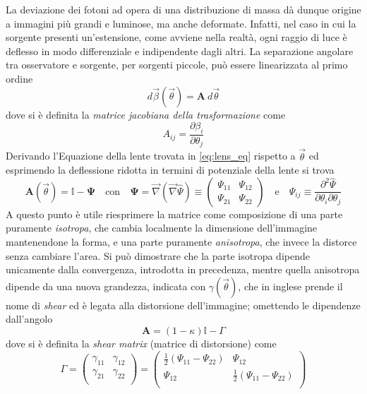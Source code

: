 La deviazione dei fotoni ad opera di una distribuzione di massa dà dunque origine a immagini più grandi e luminose, ma anche deformate. Infatti, nel caso in cui la sorgente presenti un'estensione, come avviene nella realtà, ogni raggio di luce è deflesso in modo differenziale e indipendente dagli altri. 
La separazione angolare tra osservatore e sorgente, per sorgenti piccole, può essere linearizzata al primo ordine
\begin{equation}
    d\vec\beta(\vec\theta)= \mathbf{A}\ d\vec\theta 
\end{equation}
dove si è definita la \emph{matrice jacobiana della trasformazione} come
\begin{equation}
   A_{ij}=\frac{\partial \beta_i}{\partial \theta_j}
   \label{eq:jacobian_matrix}
\end{equation}
Derivando l'Equazione della lente trovata in \ref{eq:lens_eq} rispetto a $\vec\theta$ ed esprimendo la deflessione ridotta in termini di potenziale della lente si trova 
\begin{equation}
    \mathbf{A}(\vec\theta)= \mathbb{I}- \mathbf{\Psi} \quad \text{con} \quad \mathbf{\Psi}=\vec\nabla(\vec\nabla\hat\Psi) \equiv \begin{pmatrix}
        \Psi_{11} & \Psi_{12}\\
        \Psi_{21} & \Psi_{22}
    \end{pmatrix}
    \quad \text{e} \quad \Psi_{ij}\equiv \frac{\partial^2\hat\Psi}{\partial \theta_i \partial \theta_j}
\end{equation}
A questo punto è utile riesprimere la matrice come composizione di una parte puramente \emph{isotropa}, che cambia localmente la dimensione dell'immagine mantenendone la forma, e una parte puramente \emph{anisotropa}, che invece la distorce senza cambiare l'area.
Si può dimostrare che la parte isotropa dipende unicamente dalla convergenza, introdotta in precedenza, mentre quella anisotropa dipende da una nuova grandezza, indicata con $\gamma(\vec\theta)$, che in inglese prende il nome di \emph{shear} ed è legata alla distorsione dell'immagine; omettendo le dipendenze dall'angolo
\begin{equation}
    \mathbf{A}=(1-\kappa)\mathbb{I}-\Gamma
\end{equation}
dove si è definita la \emph{shear matrix} (matrice di distorsione) come
\begin{equation}
    \Gamma= \begin{pmatrix}
        \gamma_{11} & \gamma_{12}\\
        \gamma_{21} & \gamma_{22}\\
    \end{pmatrix}=\begin{pmatrix}
        \frac{1}{2}(\Psi_{11}-\Psi_{22}) & \Psi_{12}\\
        \Psi_{12} & \frac{1}{2}(\Psi_{11}-\Psi_{22})\\
    \end{pmatrix}
\end{equation}

